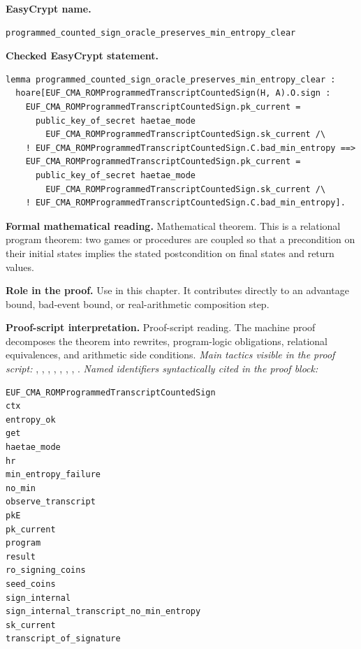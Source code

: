 \begin{formaltheorem}
\noindent\textbf{EasyCrypt name.}
\begin{lstlisting}[language=EasyCrypt,basicstyle=\ttfamily\scriptsize]
programmed_counted_sign_oracle_preserves_min_entropy_clear
\end{lstlisting}
\noindent\textbf{Checked EasyCrypt statement.}
\begin{lstlisting}[language=EasyCrypt,basicstyle=\ttfamily\scriptsize]
lemma programmed_counted_sign_oracle_preserves_min_entropy_clear :
  hoare[EUF_CMA_ROMProgrammedTranscriptCountedSign(H, A).O.sign :
    EUF_CMA_ROMProgrammedTranscriptCountedSign.pk_current =
      public_key_of_secret haetae_mode
        EUF_CMA_ROMProgrammedTranscriptCountedSign.sk_current /\
    ! EUF_CMA_ROMProgrammedTranscriptCountedSign.C.bad_min_entropy ==>
    EUF_CMA_ROMProgrammedTranscriptCountedSign.pk_current =
      public_key_of_secret haetae_mode
        EUF_CMA_ROMProgrammedTranscriptCountedSign.sk_current /\
    ! EUF_CMA_ROMProgrammedTranscriptCountedSign.C.bad_min_entropy].
\end{lstlisting}
\noindent\textbf{Formal mathematical reading.}
Mathematical theorem. This is a relational program theorem: two games or procedures are coupled so that a precondition on their initial states implies the stated postcondition on final states and return values.

\noindent\textbf{Role in the proof.}
Use in this chapter. It contributes directly to an advantage bound, bad-event bound, or real-arithmetic composition step.

\noindent\textbf{Proof-script interpretation.}
Proof-script reading. The machine proof decomposes the theorem into rewrites, program-logic obligations, relational equivalences, and arithmetic side conditions.
\emph{Main tactics visible in the proof script:} , , , , , , , .
\emph{Named identifiers syntactically cited in the proof block:}
\begin{lstlisting}[language=EasyCrypt,basicstyle=\ttfamily\scriptsize]
EUF_CMA_ROMProgrammedTranscriptCountedSign
ctx
entropy_ok
get
haetae_mode
hr
min_entropy_failure
no_min
observe_transcript
pkE
pk_current
program
result
ro_signing_coins
seed_coins
sign_internal
sign_internal_transcript_no_min_entropy
sk_current
transcript_of_signature
\end{lstlisting}

\end{formaltheorem}

